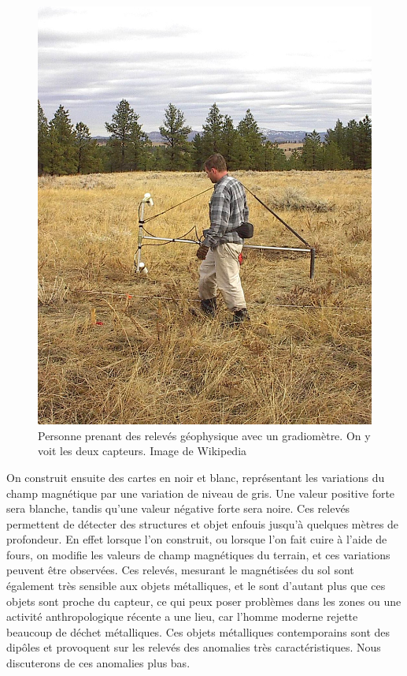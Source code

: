 \documentclass[a4paper, 12pt, titlepage, oneside, french]{article}
\begin{document}
\begin{figure}[H]
	\centering
		\includegraphics[width=12cm]{MagnetoMetre.jpeg}
		\caption{Personne prenant des relevés géophysique avec un gradiomètre. On y voit les deux capteurs. Image de Wikipedia\cite{WikiGrad}}
		\label{fig:Magnetometre}
\end{figure}
	On construit ensuite des cartes en noir et blanc, représentant les variations du champ magnétique par une variation de niveau de gris. Une valeur positive forte sera blanche, tandis qu'une valeur négative forte sera noire. Ces relevés permettent de détecter des structures et objet enfouis jusqu'à quelques mètres de profondeur. En effet lorsque l'on construit, ou lorsque l'on fait cuire à l'aide de fours, on modifie les valeurs de champ magnétiques du terrain, et ces variations peuvent être observées. Ces relevés, mesurant le magnétisées du sol sont également très sensible aux objets métalliques, et le sont d'autant plus que ces objets sont proche du capteur, ce qui peux poser problèmes dans les zones ou une activité anthropologique récente a une lieu, car l'homme moderne rejette beaucoup de déchet métalliques. Ces objets métalliques contemporains sont des dipôles et provoquent sur les relevés des anomalies très caractéristiques. Nous discuterons de ces anomalies plus bas.
\end{document}
